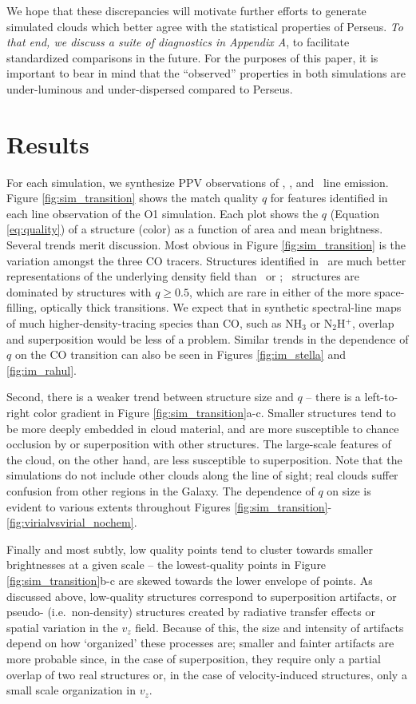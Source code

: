We hope that these discrepancies will motivate further efforts to
generate simulated clouds which better agree with the statistical
properties of Perseus. \textit{To that end, we discuss a suite of diagnostics in Appendix A},
to facilitate standardized comparisons in the future. For the purposes of this paper,
it is important to bear in mind that the ``observed'' properties in both
simulations are under-luminous and under-dispersed compared to
Perseus.

\section{Results}
\label{sec:result}

For each simulation, we synthesize PPV observations of \coa, \cob, and \coc\, line emission.  Figure \ref{fig:sim_transition} shows
the match quality $q$ for features identified in each line observation of the O1 simulation. Each plot shows the $q$ (Equation \ref{eq:quality}) of a structure
(color) as a function of area and mean brightness. Several trends merit
discussion. Most obvious in Figure \ref{fig:sim_transition} is the variation amongst the three CO tracers. Structures identified in \coc\, are much
better representations of the underlying density field than \coa\, or \cob; \coc\, structures are dominated by structures with $q\geq 0.5$, which are rare in either of the more space-filling, optically thick transitions. We expect that in synthetic spectral-line maps of much higher-density-tracing species than CO, such as NH$_3$ or N$_2$H$^+$, overlap and superposition would be less of a problem. Similar trends in the dependence of $q$ on the CO transition can also be seen in Figures \ref{fig:im_stella} and \ref{fig:im_rahul}.

Second, there is a weaker trend between structure size and $q$ -- there is a left-to-right color gradient in Figure \ref{fig:sim_transition}a-c. Smaller structures tend to be more deeply embedded in cloud material, and are more susceptible to chance occlusion by or superposition with other structures. The large-scale features of the cloud, on the other hand, are less susceptible to superposition. Note that the simulations do not include other clouds along the line of sight; real clouds suffer confusion from other regions in the Galaxy. The dependence of $q$ on size is evident to various extents throughout Figures \ref{fig:sim_transition}-\ref{fig:virialvsvirial_nochem}.

Finally and most subtly, low quality points tend to cluster towards smaller brightnesses at a given scale -- the lowest-quality points in Figure \ref{fig:sim_transition}b-c are skewed towards the lower envelope of points. As discussed above, low-quality structures
correspond to superposition artifacts, or pseudo- (i.e.~non-density)
structures created by radiative transfer effects or spatial variation in
the $v_z$ field. Because of this, the size and intensity of artifacts
depend on how `organized' these processes are; smaller and fainter artifacts are more probable since, in the case of superposition,
they require only a partial overlap of two real structures or, in the
case of velocity-induced structures, only a small scale
organization in $v_z$.

